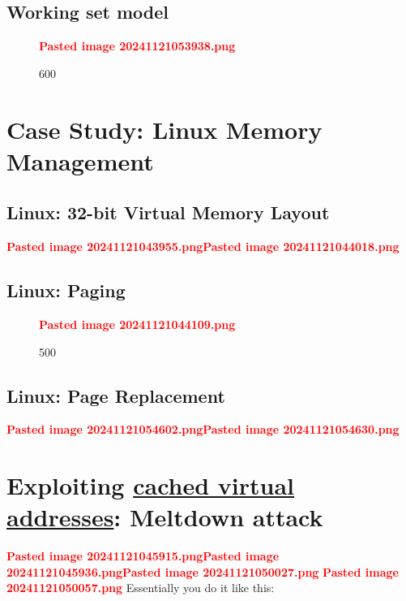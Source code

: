 \subsection*{Working set model}

\begin{figure}
\centering
\textcolor{red}{\textbf{Pasted image 20241121053938.png}}
\caption{600}
\end{figure}

\section*{Case Study: Linux Memory Management}

\subsection*{Linux: 32-bit Virtual Memory Layout}

\textcolor{red}{\textbf{Pasted image 20241121043955.png}}\textcolor{red}{\textbf{Pasted image 20241121044018.png}}

\subsection*{Linux: Paging}

\begin{figure}
\centering
\textcolor{red}{\textbf{Pasted image 20241121044109.png}}
\caption{500}
\end{figure}

\subsection*{Linux: Page Replacement}

\textcolor{red}{\textbf{Pasted image 20241121054602.png}}\textcolor{red}{\textbf{Pasted image 20241121054630.png}}

\section*{\texorpdfstring{Exploiting \ul{cached virtual addresses}:
Meltdown attack}{Exploiting cached virtual addresses: Meltdown attack}}

\textcolor{red}{\textbf{Pasted image 20241121045915.png}}\textcolor{red}{\textbf{Pasted image 20241121045936.png}}\textcolor{red}{\textbf{Pasted image 20241121050027.png}}
\textcolor{red}{\textbf{Pasted image 20241121050057.png}} Essentially
you do it like this:

